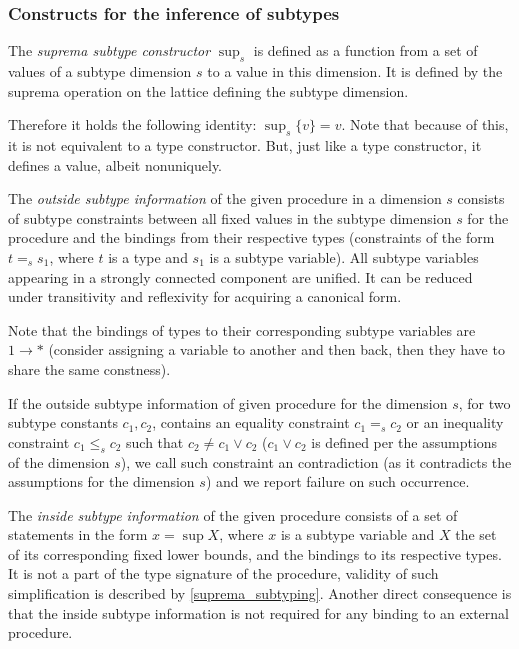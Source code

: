 \subsubsection{Constructs for the inference of subtypes}
\label{sec:iSubConstr}

The \emph{suprema subtype constructor} $\sup_s$ is defined as a function from a set of values of a subtype dimension $s$ to a value in this dimension. It is defined by the suprema operation on the lattice defining the subtype dimension.

Therefore it holds the following identity: $\sup_s \{v\} = v$. Note that because of this, it is not equivalent to a type constructor. But, just like a type constructor, it defines a value, albeit nonuniquely.

The \emph{outside subtype information }of the given procedure in a dimension $s$ consists of subtype constraints between all fixed values in the subtype dimension $s$ for the procedure and the bindings from their respective types (constraints of the form $t =_s s_1$, where $t$ is a type and $s_1$ is a subtype variable). All subtype variables appearing in a strongly connected component are unified. It can be reduced under transitivity and reflexivity for acquiring a canonical form.

Note that the bindings of types to their corresponding subtype variables are $1 \to \ast$ (consider assigning a variable to another and then back, then they have to share the same constness).

\begin{remark}
    \label{def:contra}
    If the outside subtype information of given procedure for the dimension $s$, for two subtype constants $c_1, c_2$, contains an equality constraint $c_1 =_s c_2$ or an inequality constraint $c_1 \leq_s c_2$ such that $c_2 \neq c_1 \lor c_2$ ($c_1 \lor c_2$ is defined per the assumptions of the dimension $s$), we call such constraint an contradiction (as it contradicts the assumptions for the dimension $s$) and we report failure on such occurrence.
\end{remark}

The \emph{inside subtype information} of the given procedure consists of a set of statements in the form $x = \sup X$, where $x$ is a subtype variable and $X$ the set of its corresponding fixed lower bounds, and the bindings to its respective types. It is not a part of the type signature of the procedure, validity of such simplification is described by \cref{suprema_subtyping}. Another direct consequence is that the inside subtype information is not required for any binding to an external procedure.

